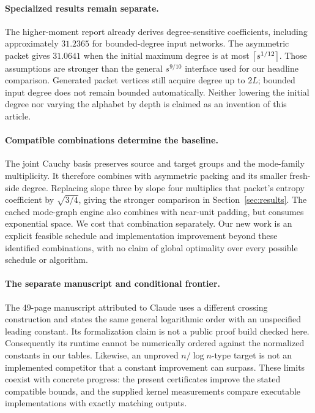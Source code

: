 \paragraph{Specialized results remain separate.}
The higher-moment report already derives degree-sensitive coefficients,
including approximately $31.2365$ for bounded-degree input networks.
The asymmetric packet gives $31.0641$ when the initial maximum degree is at
most $\left\lceil s^{1/12}\right\rceil$. Those assumptions are stronger than the general
$s^{9/10}$ interface used for our headline comparison. Generated packet
vertices still acquire degree up to $2L$; bounded input degree does not remain
bounded automatically. Neither lowering the initial degree nor varying the
alphabet by depth is claimed as an invention of this article.

\paragraph{Compatible combinations determine the baseline.}
The joint Cauchy basis preserves source and target groups and the mode-family
multiplicity. It therefore combines with asymmetric packing and its smaller
fresh-side degree. Replacing slope three by slope four multiplies that
packet's entropy coefficient by $\sqrt{3/4}$, giving the stronger comparison
in Section~\ref{sec:results}. The cached mode-graph engine also combines with
near-unit padding, but consumes exponential space. We cost that combination
separately. Our new work is an explicit feasible schedule and implementation
improvement beyond these identified combinations, with no claim of global
optimality over every possible schedule or algorithm.

\paragraph{The separate manuscript and conditional frontier.}
The 49-page manuscript attributed to Claude uses a different crossing
construction and states the same general logarithmic order with an unspecified
leading constant\cite{claude}. Its formalization claim is not a public proof
build checked here. Consequently its runtime cannot be numerically ordered
against the normalized constants in our tables. Likewise, an unproved
$n/\log n$-type target is not an implemented competitor that a constant
improvement can surpass. These limits coexist with concrete progress: the
present certificates improve the stated compatible bounds, and the supplied
kernel measurements compare executable implementations with exactly matching
outputs.
